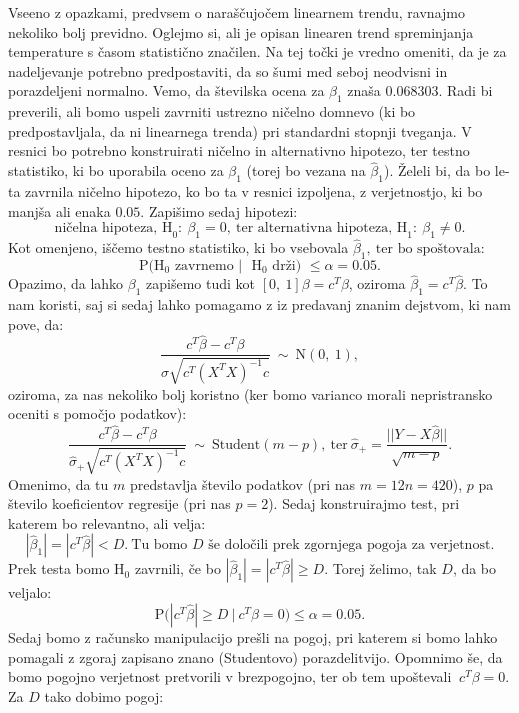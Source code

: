\documentclass{article}
\begin{document}
Vseeno z opazkami, predvsem o naraščujočem linearnem trendu, ravnajmo nekoliko bolj previdno. 
Oglejmo si, ali je opisan linearen trend spreminjanja temperature s časom statistično značilen. 
\newline
Na tej točki je vredno omeniti, da je za nadeljevanje potrebno predpostaviti, da so šumi med seboj neodvisni in porazdeljeni normalno.
Vemo, da številska ocena za $\beta_{1}$ znaša $0.068303$. 
Radi bi preverili, ali bomo uspeli zavrniti ustrezno ničelno domnevo (ki bo predpostavljala, da ni linearnega trenda) pri standardni stopnji tveganja. 
V resnici bo potrebno konstruirati ničelno in alternativno hipotezo, ter testno statistiko, ki bo uporabila oceno za $\beta_1$ (torej bo vezana na $\hat{\beta}_1$). Želeli bi, da bo le-ta zavrnila ničelno hipotezo, ko bo ta v resnici izpoljena, z verjetnostjo, ki bo manjša ali enaka $0.05$. 
\newline
Zapišimo sedaj hipotezi:
$$
\text{ničelna hipoteza, H}_0:~\beta_1 = 0,~\text{ter alternativna hipoteza, H}_1:~\beta_1 \neq 0.
$$
Kot omenjeno, iščemo testno statistiko, ki bo vsebovala $\hat{\beta}_1,~\text{ter bo spoštovala:}$
$$
\text{P($\text{H}_0$ zavrnemo $|$ $\text{H}_0$ drži) $\leq \alpha = 0.05$}. 
$$
Opazimo, da lahko $\beta_1$ zapišemo tudi kot $[0,~1]\beta = c^T\beta$, oziroma $\hat{\beta}_1 = c^T\hat{\beta}$.
To nam koristi, saj si sedaj lahko pomagamo z iz predavanj znanim dejstvom, ki nam pove, da:
$$
    \frac{c^T\hat{\beta} - c^T \beta}{\sigma\sqrt{c^T(X^TX)^{-1}c}}~\sim~\text{N}(0,~1), 
$$
oziroma, za nas nekoliko bolj koristno (ker bomo varianco morali nepristransko oceniti s pomočjo podatkov):
$$
\frac{c^T\hat{\beta} - c^T \beta}{\hat{\sigma}_{+}\sqrt{c^T(X^TX)^{-1}c}}~\sim~\text{Student}(m - p),~\text{ter}~ \hat{\sigma}_{+} = \frac{||Y - X\hat{\beta}||}{\sqrt{m - p}}.
$$
Omenimo, da tu $m$ predstavlja število podatkov (pri nas $m = 12n = 420$), $p$ pa število koeficientov regresije (pri nas $p = 2$).
Sedaj konstruirajmo test, pri katerem bo relevantno, ali velja:
$$
    |\hat{\beta}_1| = |c^T\hat{\beta}| < D.~\text{Tu bomo $D$ še določili prek zgornjega pogoja za verjetnost}.
$$
Prek testa bomo $\text{H}_0$ zavrnili, če bo $|\hat{\beta}_1| = |c^T\hat{\beta}| \geq D$. Torej želimo, tak $D$, da bo veljalo:
$$
\text{P$(|c^T\hat{\beta}|$} \geq D~|~c^T\beta = 0)\leq \alpha = 0.05. 
$$
Sedaj bomo z računsko manipulacijo prešli na pogoj, pri katerem si bomo lahko pomagali z zgoraj zapisano znano (Studentovo) porazdelitvijo. 
Opomnimo še, da bomo pogojno verjetnost pretvorili v brezpogojno, ter ob tem upoštevali $~c^T\beta = 0$.
Za $D$ tako dobimo pogoj:
\end{document}
